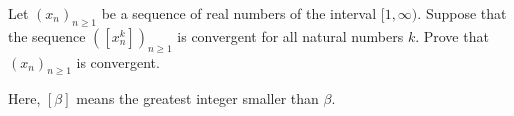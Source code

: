 Let $ \left( x_n\right)_{n\ge 1} $ be a sequence of real numbers of the interval $ [1,\infty) . $ Suppose that the sequence $ \left( \left[ x_n^k\right]\right)_{n\ge 1} $ is convergent for all natural numbers $ k. $ Prove that $ \left( x_n\right)_{n\ge 1} $ is convergent.

Here, $ [\beta ] $ means the greatest integer smaller than $ \beta . $